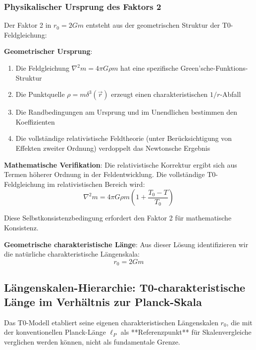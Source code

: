 \documentclass[12pt,a4paper]{article}
\begin{document}
\subsubsection{Physikalischer Ursprung des Faktors 2}
\label{subsubsec:factor_2_origin}

Der Faktor 2 in $r_0 = 2Gm$ entsteht aus der geometrischen Struktur der T0-Feldgleichung:

\textbf{Geometrischer Ursprung}:
\begin{enumerate}
	\item Die Feldgleichung $\nabla^2 m = 4\pi G \rho m$ hat eine spezifische Green'sche-Funktions-Struktur
	\item Die Punktquelle $\rho = m \delta^3(\vec{r})$ erzeugt einen charakteristischen $1/r$-Abfall
	\item Die Randbedingungen am Ursprung und im Unendlichen bestimmen den Koeffizienten
	\item Die vollständige relativistische Feldtheorie (unter Berücksichtigung von Effekten zweiter Ordnung) verdoppelt das Newtonsche Ergebnis
\end{enumerate}

\textbf{Mathematische Verifikation}:
Die relativistische Korrektur ergibt sich aus Termen höherer Ordnung in der Feldentwicklung. Die vollständige T0-Feldgleichung im relativistischen Bereich wird:
\begin{equation}
	\nabla^2 m = 4\pi G \rho m \left(1 + \frac{T_0 - T}{T_0}\right)
\end{equation}

Diese Selbstkonsistenzbedingung erfordert den Faktor 2 für mathematische Konsistenz.

\textbf{Geometrische charakteristische Länge}: Aus dieser Lösung identifizieren wir die natürliche charakteristische Längenskala:
\begin{equation}
	\boxed{r_0 = 2Gm}
\end{equation}

\subsection{Längenskalen-Hierarchie: T0-charakteristische Länge im Verhältnis zur Planck-Skala}
\label{subsec:planck_comparison}

Das T0-Modell etabliert seine eigenen charakteristischen Längenskalen $r_0$, die mit der konventionellen Planck-Länge $\ell_P$ als **Referenzpunkt** für Skalenvergleiche verglichen werden können, nicht als fundamentale Grenze.
\end{document}
